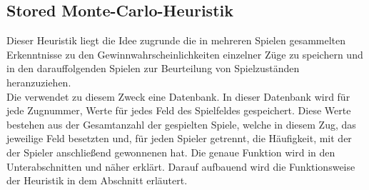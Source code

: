 \subsection{Stored Monte-Carlo-Heuristik}
\label{impl:stored-mc}
Dieser Heuristik liegt die Idee zugrunde die in mehreren Spielen gesammelten Erkenntnisse zu den Gewinnwahrscheinlichkeiten einzelner Züge zu speichern und in den darauffolgenden Spielen zur Beurteilung von Spielzuständen heranzuziehen.
\\Die {} verwendet zu diesem Zweck eine Datenbank. In dieser Datenbank wird für jede Zugnummer, Werte für jedes Feld des Spielfeldes gespeichert. Diese Werte bestehen aus der Gesamtanzahl der gespielten Spiele, welche in diesem Zug, das jeweilige Feld besetzten und, für jeden Spieler getrennt, die Häufigkeit, mit der der Spieler anschließend gewonnenen hat. Die genaue Funktion wird in den Unterabschnitten  und  näher erklärt. Darauf aufbauend wird die Funktionsweise der Heuristik in dem Abschnitt  erläutert.
